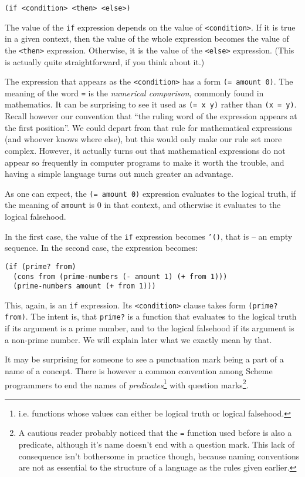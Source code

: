 \texttt{(if <condition> <then> <else>)}

The value of the \texttt{if} expression depends on the value
of \texttt{<condition>}. If it is true in a given context, then
the value of the whole expression becomes the value of the 
\texttt{<then>} expression. Otherwise, it is the value of the
\texttt{<else>} expression. (This is actually quite straightforward,
if you think about it.)

The expression that appears as the \texttt{<condition>} has 
a form \texttt{(= amount 0)}. The meaning of the word \texttt{=} is
the \textit{numerical comparison}, commonly found in mathematics. It
can be surprising to see it used as \texttt{(= x y)} rather
than \texttt{(x = y)}. Recall however our convention that
``the ruling word of the expression appears at the first
position''. We could depart from that rule for mathematical
expressions (and whoever knows where else), but this would
only make our rule set more complex. However, it actually
turns out that mathematical expressions do not appear so
frequently in computer programs to make it worth the trouble,
and having a simple language turns out much greater an
advantage.

As one can expect, the \texttt{(= amount 0)} expression evaluates
to the logical truth, if the meaning of \texttt{amount} is 0 in that
context, and otherwise it evaluates to the logical falsehood.

In the first case, the value of the \texttt{if} expression
becomes \texttt{'()}, that is -- an empty sequence. In the
second case, the expression becomes:

\begin{Verbatim}[samepage=true]
(if (prime? from)
  (cons from (prime-numbers (- amount 1) (+ from 1)))
  (prime-numbers amount (+ from 1)))
\end{Verbatim}

This, again, is an \texttt{if} expression. Its \texttt{<condition>}
clause takes form \texttt{(prime? from)}. The intent is, that
\texttt{prime?} is a function that evaluates to the logical
truth if its argument is a prime number, and to the logical
falsehood if its argument is a non-prime number. We will explain
later what we exactly mean by that.

It may be surprising for someone to see a punctuation mark
being a part of a name of a concept. There is however a common
convention among Scheme programmers to end the names of
\textit{predicates}\footnote{i.e. functions whose values can either
be logical truth or logical falsehood.} with question marks\footnote{
A cautious reader probably noticed that the \texttt{=} function
used before is also a predicate, although it's name doesn't end
with a question mark.
This lack of consequence isn't bothersome in practice though, because
naming conventions are not as essential to the structure of a language
as the rules given earlier.}.

